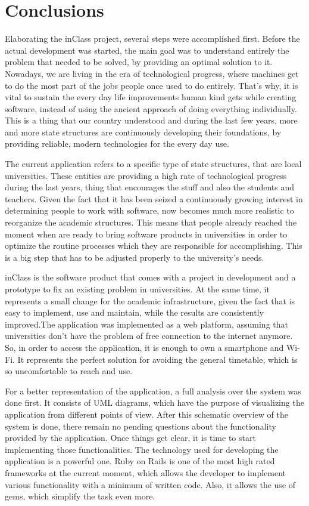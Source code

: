 \section*{Conclusions}
Elaborating the inClass project, several steps were accomplished first. Before the actual development was started, the main goal was to understand entirely the problem that needed to be solved, by providing an optimal solution to it. Nowadays, we are living in the era of technological progress, where machines get to do the most part of the jobs people once used to do entirely. That's why, it is vital to sustain the every day life improvements human kind gets while creating software, instead of using the ancient approach of doing everything individually.  This is a thing that our country understood and during the last few years, more and more state structures are continuously developing their foundations, by providing reliable, modern technologies for the every day use. 

The current application refers to a specific type of state structures, that are local universities. These entities are providing a high rate of technological progress during the last years, thing that encourages the stuff and also the students and teachers. Given the fact that it has been seized a continuously growing interest in determining people to work with software, now becomes much more realistic to reorganize the academic structures. This means that people already reached the moment when are ready to bring software products in universities in order to optimize the routine processes which they are responsible for accomplishing.  This is a big step that has to be adjusted properly to the university's needs. 

inClass is the software product that comes with a project in development and a prototype to fix an existing problem in universities. At the same time, it represents a small change for the academic infrastructure, given the fact that is easy to implement, use and maintain, while the results are consistently improved.The application was implemented as a web platform, assuming that universities don't have the problem of free connection to the internet anymore. So, in order to access the application, it is enough to own a smartphone and Wi-Fi. It represents the perfect solution for avoiding the general timetable, which is so uncomfortable to reach and use.

For a better representation of the application, a full analysis over the system was done first. It consists of UML diagrams, which have the purpose of visualizing the application from different points of view. After this schematic overview of the system is done, there remain no pending questions about the functionality provided by the application. Once things get clear, it is time to start implementing those functionalities. The technology used for developing the application is a powerful one. Ruby on Rails is one of the most high rated frameworks at the current moment, which allows the developer to implement various functionality with a minimum of written code. Also, it allows the use of gems, which simplify the task even more. 

